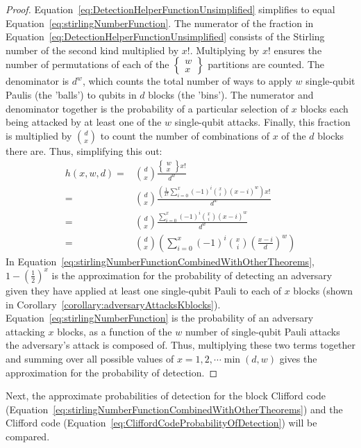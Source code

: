 \begin{proof}
Equation~\eqref{eq:DetectionHelperFunctionUnsimplified} simplifies to equal Equation~\eqref{eq:stirlingNumberFunction}. The numerator of the fraction in Equation~\eqref{eq:DetectionHelperFunctionUnsimplified} consists of the Stirling number of the second kind multiplied by $x!$. Multiplying by $x!$ ensures the number of permutations of each of the $\left\{\begin{smallmatrix}w\\x\end{smallmatrix}\right\}$ partitions are counted. The denominator is $d^w$, which counts the total number of ways to apply $w$ single-qubit Paulis (the 'balls') to qubits in $d$ blocks (the 'bins'). The numerator and denominator together is the probability of a particular selection of $x$ blocks each being attacked by at least one of the $w$ single-qubit attacks. Finally, this fraction is multiplied by ${d \choose x}$ to count the number of combinations of $x$ of the $d$ blocks there are. Thus, simplifying this out:
\begin{align}
h(x,w,d)=&{d \choose x} \frac{\left\{\begin{smallmatrix}w\\x\end{smallmatrix}\right\}x!}{d^w} \label{eq:DetectionHelperFunctionUnsimplified} \\
=& {d \choose x} \frac{\left(\frac{1}{x !} \sum_{i=0}^{x}(-1)^{i}{x \choose i}(x-i)^{w}\right)x!}{d^w}\\
=& {d \choose x} \frac{\sum_{i=0}^{x}(-1)^{i}{x \choose i}(x-i)^{w}}{d^w}\\
=& {d \choose x}\left(\sum_{i=0} ^{x}(-1)^{i}{x \choose i}\left(\frac{x-i}{d}\right)^w \right)
\end{align}
In Equation~\eqref{eq:stirlingNumberFunctionCombinedWithOtherTheorems}, $1-\left(\frac{1}{2}\right)^{x}$ is the approximation for the probability of detecting an adversary given they have applied at least one single-qubit Pauli to each of $x$ blocks (shown in Corollary~\ref{corollary:adversaryAttacksKblocks}). Equation~\eqref{eq:stirlingNumberFunction} is the probability of an adversary attacking $x$ blocks, as a function of the $w$ number of single-qubit Pauli attacks the adversary's attack is composed of. Thus, multiplying these two terms together and summing over all possible values of $x = 1, 2, \cdots \min(d,w)$ gives the approximation for the probability of detection.
\end{proof}
Next, the approximate probabilities of detection for the block Clifford code (Equation~\eqref{eq:stirlingNumberFunctionCombinedWithOtherTheorems}) and the Clifford code (Equation~\eqref{eq:CliffordCodeProbabilityOfDetection}) will be compared.
